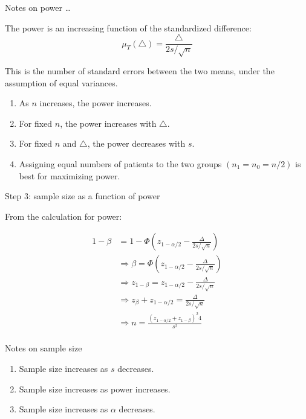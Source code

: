 \documentclass[ignorenonframetext,]{beamer}
\begin{document}
\begin{frame}{%
\protect\hypertarget{notes-on-power}{%
Notes on power \ldots}}

The power is an increasing function of the standardized difference:
\[ \mu_T(\triangle) =  \frac{\triangle}{2s / \sqrt{n}} \]

This is the number of standard errors between the two means, under the
assumption of equal variances.

\begin{enumerate}
\item As $n$ increases, the power increases.
\item For fixed $n$, the power increases with $\triangle$.
\item For fixed $n$ and $\triangle$, the power decreases with $s$.
\item Assigning equal numbers of patients to the two groups 
$(n_1=n_0=n/2)$ is best for maximizing power.
\end{enumerate}

\end{frame}

\begin{frame}{%
\protect\hypertarget{step-3-sample-size-as-a-function-of-power}{%
Step 3: sample size as a function of power}}

From the calculation for power:

\begin{align*}
1 - \beta &= 1 - \Phi\left(z_{1-\alpha/2} - \frac{\Delta}{2s/\sqrt{n}}\right) \\
&\Longrightarrow \beta = \Phi\left(z_{1-\alpha/2} - \frac{\Delta}{2s/\sqrt{n}}\right) \\
&\Longrightarrow z_{1 - \beta} = z_{1 - \alpha/2} - \frac{\Delta}{2s/\sqrt{n}} \\
&\Longrightarrow z_{\beta} + z_{1 - \alpha/2} = \frac{\Delta}{2s/\sqrt{n}} \\
&\Longrightarrow n  = \frac{(z_{1-\alpha/2} + z_{1-\beta})^2 4} {s^2} \\
\end{align*}

\end{frame}

\begin{frame}{%
\protect\hypertarget{notes-on-sample-size}{%
Notes on sample size}}

\begin{enumerate}
\item  Sample size increases as $s$ decreases.
\item  Sample size increases as power increases.
\item  Sample size increases as $\alpha$ decreases.

\end{enumerate}

\end{frame}
\end{document}
